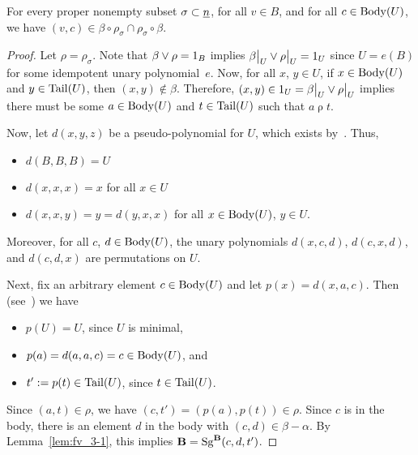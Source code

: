 \begin{lemma}\label{lem:nearperm}
  For every proper nonempty subset $\sigma \subset \underline{n}$,
  for all $v\in B$, and for all $c\in \operatorname{Body}(U)$, we have
  $(v,c) \in \beta \circ \rho_\sigma \cap \rho_\sigma \circ \beta$.
\end{lemma}

\newcommand\rhosig{\ensuremath{\rho}}
\begin{proof}
\noindent Let $\rho = \rho_\sigma$. Note that
$\beta \join \rhosig = 1_B$ implies
$\restr{\beta}{U} \join \restr{\rhosig}{U} = 1_U$ since $U = e(B)$
for some idempotent unary polynomial~$e$.
Now, for all $x$, $y \in U$, if $x\in \operatorname{Body}(U)$ and $y\in \operatorname{Tail}(U)$, then
$(x,y) \notin \beta$.  Therefore,
$(x, y) \in  1_U = \restr{\beta}{U} \join \restr{\rhosig}{U}$ implies
there must be some $a \in \operatorname{Body}(U)$ and $t\in \operatorname{Tail}(U)$ such that 
$a \mathrel{\rhosig} t$.  





Now, let $d(x,y,z)$ be a pseudo-\malcev polynomial for $U$,
which exists by~\cite[Lemma~4.20]{HM:1988}.
Thus,
\begin{itemize}
\item $d(B,B,B) = U$
\item $d(x,x,x) = x$ for all $x\in U$
\item $d(x,x,y) = y = d(y,x,x)$ for all $x\in \operatorname{Body}(U)$, $y \in U$.
\end{itemize}
Moreover, for all $c$, $d \in \operatorname{Body}(U)$, the unary polynomials
$d(x,c,d)$, $d(c,x,d)$, and $d(c,d,x)$ are permutations on $U$.

Next, fix an arbitrary element $c\in \operatorname{Body}(U)$ and
let $p(x) = d(x,a,c)$. 
Then (see~\cite[Lem.~4.20]{HM:1988})
we have
\begin{itemize}
\item  $p(U) = U$, since $U$ is minimal,
\item $p(a) = d(a,a,c) = c \in \operatorname{Body}(U)$, and
  \item  $t':=p(t)\in \operatorname{Tail}(U)$, since $t\in \operatorname{Tail}(U)$.
\end{itemize}
Since $(a,t) \in \rhosig$, we have $(c, t') = (p(a), p(t)) \in \rhosig$. 
Since $c$ is in the body, there is an element $d$ in the body with
$(c,d) \in \beta - \alpha$. By Lemma~\ref{lem:fv_3-1}, this implies
$\mathbf{B} = \operatorname{Sg}^{\mathbf{B}}(c, d, t')$.


\end{proof}
